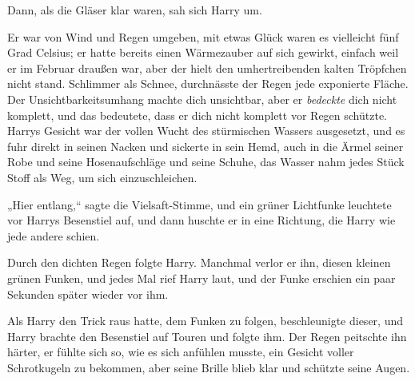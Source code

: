 Dann, als die Gläser klar waren, sah sich Harry um.

Er war von Wind und Regen umgeben, mit etwas Glück waren es vielleicht fünf Grad Celsius; er hatte bereits einen Wärmezauber auf sich gewirkt, einfach weil er im Februar draußen war, aber der hielt den umhertreibenden kalten Tröpfchen nicht stand. Schlimmer als Schnee, durchnässte der Regen jede exponierte Fläche. Der Unsichtbarkeitsumhang machte dich unsichtbar, aber er \emph{bedeckte} dich nicht komplett, und das bedeutete, dass er dich nicht komplett vor Regen schützte. Harrys Gesicht war der vollen Wucht des stürmischen Wassers ausgesetzt, und es fuhr direkt in seinen Nacken und sickerte in sein Hemd, auch in die Ärmel seiner Robe und seine Hosenaufschläge und seine Schuhe, das Wasser nahm jedes Stück Stoff als Weg, um sich einzuschleichen.

„Hier entlang,“ sagte die Vielsaft-Stimme, und ein grüner Lichtfunke leuchtete vor Harrys Besenstiel auf, und dann huschte er in eine Richtung, die Harry wie jede andere schien.

Durch den dichten Regen folgte Harry. Manchmal verlor er ihn, diesen kleinen grünen Funken, und jedes Mal rief Harry laut, und der Funke erschien ein paar Sekunden später wieder vor ihm.

Als Harry den Trick raus hatte, dem Funken zu folgen, beschleunigte dieser, und Harry brachte den Besenstiel auf Touren und folgte ihm. Der Regen peitschte ihn härter, er fühlte sich so, wie es sich anfühlen musste, ein Gesicht voller Schrotkugeln zu bekommen, aber seine Brille blieb klar und schützte seine Augen.


